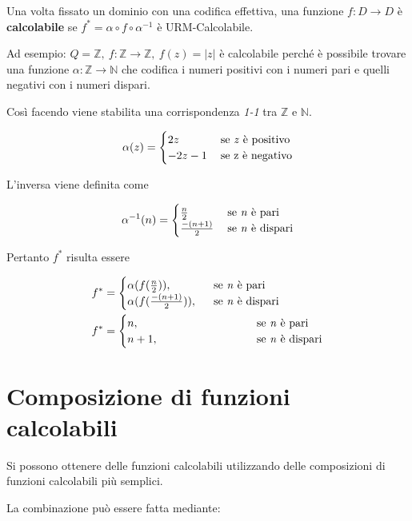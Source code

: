Una volta fissato un dominio con una codifica effettiva, una funzione
$f: D \rightarrow D$ è \textbf{calcolabile} se $f^* = \alpha \circ f \circ \alpha^{-1}$ è URM-Calcolabile.

Ad esempio: $Q = \mathbb{Z},\: f : \mathbb{Z} \rightarrow \mathbb{Z},\: f(z) =
|z|$ è calcolabile perché è possibile trovare una funzione $\alpha : \mathbb{Z}
\rightarrow \mathbb{N}$ che codifica i numeri positivi con i numeri pari e
quelli negativi con i numeri dispari.

Così facendo viene stabilita una corrispondenza \textit{1-1} tra $\mathbb{Z}$ e $\mathbb{N}$.


$$\alpha(z) = \begin{cases}
2z\:& \text{se \textit{z} è positivo} \\
-2z-1\:& \text{se z è negativo}
\end{cases}$$

L'inversa viene definita come

$$\alpha^{-1}(n) = \begin{cases} \frac{n}{2} \:& \text{se \textit{n} è pari}\\
 \frac{-(n+1)}{2}\:& \text{se \textit{n} è dispari}\end{cases}$$

Pertanto $f^*$ risulta essere

\begin{align*}
	f^* &=\begin{cases}
	\alpha(f(\frac{n}{2})), \:\:\:& \text{se \textit{n} è pari}\\
	\alpha(f(\frac{-(n+1)}{2})), \:\:\:& \text{se \textit{n} è dispari}
	\end{cases} \\	
	f^* &= \begin{cases}
	n, \qquad\qquad\qquad\qquad& \text{se \textit{n} è pari} \\
	n+1, \qquad\qquad\qquad\qquad& \text{se \textit{n} è dispari}
	\end{cases} 
\end{align*}


\section{Composizione di funzioni calcolabili}\label{composizione-di-funzioni-calcolabili}

Si possono ottenere delle funzioni calcolabili utilizzando delle
composizioni di funzioni calcolabili più semplici.

La combinazione può essere fatta mediante:

